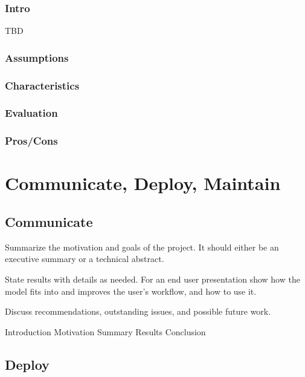 \documentclass[]{book}
\theoremstyle{definition}
\theoremstyle{definition}
\theoremstyle{definition}
\theoremstyle{remark}
\begin{document}
\subsection{Intro}\label{intro-17}

TBD

\subsection{Assumptions}\label{assumptions-17}

\subsection{Characteristics}\label{characteristics-12}

\subsection{Evaluation}\label{evaluation-16}

\subsection{Pros/Cons}\label{proscons-17}

\chapter{Communicate, Deploy,
Maintain}\label{communicate-deploy-maintain}

\section{Communicate}\label{communicate-1}

Summarize the motivation and goals of the project. It should either be
an executive summary or a technical abstract.

State results with details as needed. For an end user presentation show
how the model fits into and improves the user's workflow, and how to use
it.

Discuss recommendations, outstanding issues, and possible future work.

Introduction \textbar{} Motivation \textbar{} Summary \textbar{} Results
\textbar{} Conclusion

\section{Deploy}\label{deploy}
\end{document}
